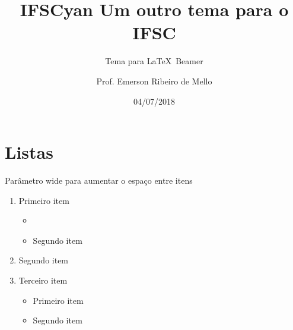 \documentclass{beamer}
\title{IFSCyan Um outro tema para o IFSC}
\subtitle{Tema para \LaTeX~Beamer}
\author{Prof. Emerson Ribeiro de Mello}
\institute{
    \href{mello@ifsc.edu.br}{mello@ifsc.edu.br}
}
\date{04/07/2018}
\begin{document}
\begin{frame}[plain]
	\titlepage
\end{frame}




\section{Listas}

\begin{frame}[wide]{Parâmetro wide para aumentar o espaço entre itens}
	\begin{enumerate}
		\item Primeiro item
		\begin{itemize}
			\item {}
			\item Segundo item
		\end{itemize}
		\item Segundo item
		\item Terceiro item 
		\begin{itemize}
			\item Primeiro item
			\item Segundo item
		\end{itemize}
	\end{enumerate}
\end{frame}
\end{document}
